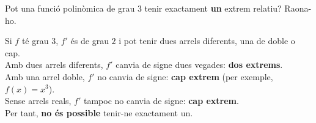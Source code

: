 \begin{apartats}
Pot una funció polinòmica de grau $3$ tenir exactament \textbf{un} extrem relatiu? Raona-ho.

\begin{solucio}
Si $f$ té grau $3$, $f'$ és de grau $2$ i pot tenir dues arrels diferents, una de doble o cap.\\
Amb dues arrels diferents, $f'$ canvia de signe dues vegades: \textbf{dos extrems}.\\
Amb una arrel doble, $f'$ no canvia de signe: \textbf{cap extrem} (per exemple, $f(x)=x^3$).\\
Sense arrels reals, $f'$ tampoc no canvia de signe: \textbf{cap extrem}.\\
Per tant, \textbf{no és possible} tenir-ne exactament un.
\end{solucio}

\end{apartats}
